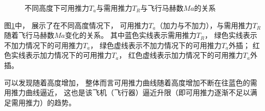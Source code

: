 \begin{figure}[H]
{    }
    \quad
    \caption{不同高度下可用推力$T_a$与需用推力$T_R$与飞行马赫数$Ma$的关系}
    \label{不同高度下可用推力与需用推力与飞行马赫数的关系}
\end{figure}


图\ref{不同高度下可用推力与需用推力与飞行马赫数的关系}中，
展示了在不同高度情况下，
可用推力$T_a$（加力与不加力），与需用推力$T_R$随着飞行马赫数$Ma$变化的关系。
其中蓝色实线表示需用推力$T_R$，
绿色实线表示不加力情况下的可用推力$T_a$，
绿色虚线表示不加力情况下的可用推力$T_a$外插；
红色实线表示加力情况下的可用推力$T_a$，
红色虚线表示加力情况下的可用推力$T_a$外插。

可以发现随着高度增加，
整体而言可用推力曲线随着高度增加不断在往蓝色的需用推力曲线逼近，
这也是该飞机（飞行器）逼近升限（即可用推力逐渐不足以满足需用推力）的趋势。